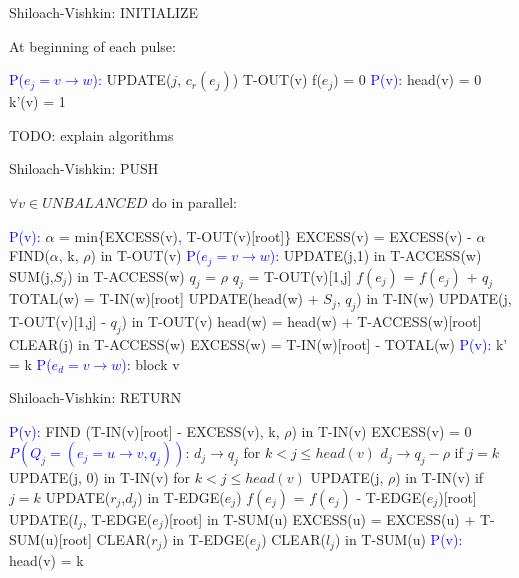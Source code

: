 \documentclass[a4paper,10pt, twocolumn]{article}
\begin{document}
\begin{algorithm}
\caption{Shiloach-Vishkin: INITIALIZE}
\label{algo:sv_init}
At beginning of each pulse:	
\begin{algorithmic}[1]
		\State \textcolor{blue}{P($e_j = v \rightarrow w$):}
		\State UPDATE($j$, $c_r(e_j)$) T-OUT(v)
		\State f($e_j$) = 0
		\State \textcolor{blue}{P(v):}
		\State head(v) = 0	
		\State k'(v) = 1	
 	\EndFunction
\end{algorithmic}
\end{algorithm}

TODO: explain algorithms

\begin{algorithm}
\caption{Shiloach-Vishkin: PUSH}
\label{algo:sv_push}
$\forall v \in UNBALANCED$ do in parallel:
\begin{algorithmic}[1]
		\State \textcolor{blue}{P(v):}
		\State $\alpha$ = min\{EXCESS(v), T-OUT(v)[root]\} 
		\State EXCESS(v) = EXCESS(v) - $\alpha$
		\State FIND($\alpha$, k, $\rho$) in T-OUT(v)
		\State \textcolor{blue}{P($e_j = v \rightarrow w$):}
 		\State UPDATE(j,1) in T-ACCESS(w)
		\State SUM(j,$S_j$) in T-ACCESS(w)
			$q_j$ = $\rho$
		\Else
			\State $q_j$ = T-OUT(v)[1,j]
		\EndIf
		\State $f(e_j)$ = $f(e_j)$ + $q_j$
		\State TOTAL(w) = T-IN(w)[root]
		\State UPDATE(head(w) + $S_j$, $q_j$) in T-IN(w)
		\State UPDATE(j, T-OUT(v)[1,j] - $q_j$) in T-OUT(v)
		\State head(w) = head(w) + T-ACCESS(w)[root] 
		\State CLEAR(j) in T-ACCESS(w)
		\State EXCESS(w) = T-IN(w)[root] - TOTAL(w)
		\EndIf
		\State \textcolor{blue}{P(v):} k' = k
		\State \textcolor{blue}{P($e_d = v \rightarrow w$):}
			\State block v
		\EndIf
 	\EndFunction
\end{algorithmic}
\end{algorithm}


\begin{algorithm}
\caption{Shiloach-Vishkin: RETURN}
\label{algo:sv_return}
\begin{algorithmic}[1]
		\State \textcolor{blue}{P(v):}
		\State FIND (T-IN(v)[root] - EXCESS(v), k, $\rho$) in T-IN(v)
		\State EXCESS(v) = 0
		\State \textcolor{blue}{$P(Q_j = (e_j = u \rightarrow v, q_j))$:}
		\State $d_j \rightarrow q_j$ for $k < j \leq head(v)$
		\State $d_j \rightarrow q_j - \rho$ if $j = k$
		\State UPDATE(j, 0) in T-IN(v) for $k < j \leq head(v)$
		\State UPDATE(j, $\rho$) in T-IN(v) if $j = k$
		\State UPDATE($r_j$,$d_j$) in T-EDGE($e_j$)
		\State $f(e_j)$ = $f(e_j)$ - T-EDGE($e_j$)[root]
		\State UPDATE($l_j$, T-EDGE($e_j$)[root] in T-SUM(u)
		\State EXCESS(u) = EXCESS(u) + T-SUM(u)[root]
		\State CLEAR($r_j$) in T-EDGE($e_j$)
		\State CLEAR($l_j$) in T-SUM(u)
		\State \textcolor{blue}{P(v):}
		\State head(v) = k
	\EndFunction
\end{algorithmic}
\end{algorithm}
\end{document}
